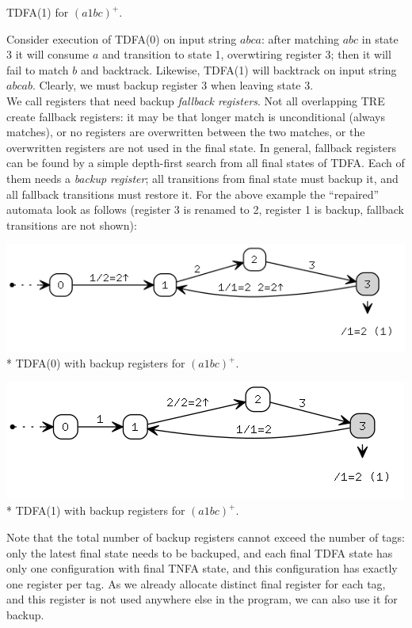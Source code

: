 \documentclass{article}
\theoremstyle{definition}
\begin{document}
\begin{multicols}{2}
\begin{center}
\small{TDFA(1) for $(a 1 bc)^+$.} \\
\end{center}
Consider execution of TDFA(0) on input string $abca$: after matching $abc$ in state 3 it will consume $a$ and transition to state 1,
overwtiring register 3; then it will fail to match $b$ and backtrack.
Likewise, TDFA(1) will backtrack on input string $abcab$.
Clearly, we must backup register 3 when leaving state 3.
\\

We call registers that need backup \emph{fallback registers}.
Not all overlapping TRE create fallback registers:
it may be that longer match is unconditional (always matches),
or no registers are overwritten between the two matches,
or the overwritten registers are not used in the final state.
In general, fallback registers can be found by a simple depth-first search from all final states of TDFA.
Each of them needs a \emph{backup register};
all transitions from final state must backup it, and all fallback transitions must restore it.
For the above example the ``repaired'' automata look as follows
(register 3 is renamed to 2, register 1 is backup, fallback transitions are not shown):
\begin{center}
\includegraphics[width=\linewidth]{img/fallback/tdfa0_fallback.png}\\*
\small{TDFA(0) with backup registers for $(a 1 bc)^+$.} \\
\end{center}
\begin{center}
\includegraphics[width=\linewidth]{img/fallback/tdfa1_fallback.png}\\*
\small{TDFA(1) with backup registers for $(a 1 bc)^+$.} \\
\end{center}
Note that the total number of backup registers cannot exceed the number of tags:
only the latest final state needs to be backuped,
and each final TDFA state has only one configuration with final TNFA state,
and this configuration has exactly one register per tag.
As we already allocate distinct final register for each tag,
and this register is not used anywhere else in the program,
we can also use it for backup.


\end{multicols}
\end{document}
